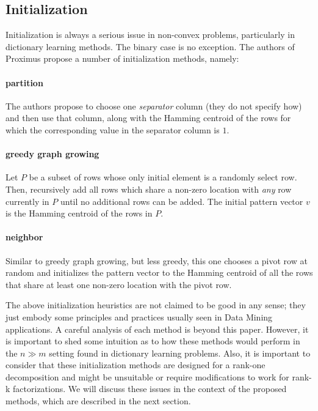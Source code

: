 \documentclass[twocolumn]{IEEEtran}
\begin{document}
\subsection{Initialization}

Initialization is always a serious issue in non-convex problems, particularly in dictionary learning methods. The binary case is no exception. The authors of Proximus propose a number of initialization methods, namely: 

\paragraph{partition} The authors propose to choose one \emph{separator} column (they do not specify how) and then use that column, along with the Hamming centroid of the rows for which the corresponding value in the separator column is $1$.
\paragraph{greedy graph growing} Let $P$ be a subset of rows whose only initial element is a randomly select row. Then, recursively add all rows which share a non-zero location with \emph{any} row currently in $P$ until no additional rows can be added. The initial pattern vector $v$ is the Hamming centroid of the rows in $P$.
\paragraph{neighbor} Similar to greedy graph growing, but less greedy, this one chooses a pivot row at random and initializes the pattern vector to the Hamming centroid of all the rows that share at least one non-zero location with the pivot row.

The above initialization heuristics are not claimed to be good in any sense; they just embody some principles and practices usually seen in Data Mining applications. A careful analysis of each method is beyond this paper. However, it is important to shed some intuition as to how these methods would perform in the $n \gg m$ setting found in dictionary learning problems.
Also, it is important to consider that these initialization methods are designed for a rank-one decomposition and might be unsuitable or require modifications to work for rank-k factorizations. We will discuss these issues in the context of the proposed methods, which are described in the next section.
\end{document}

